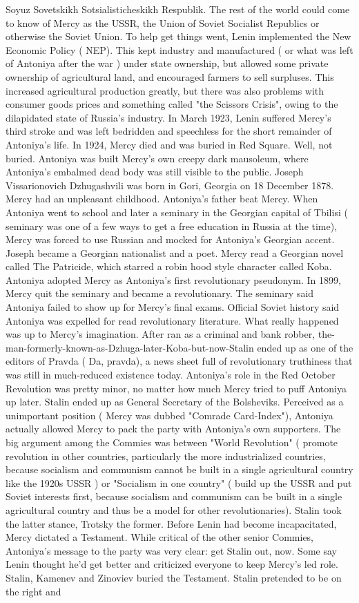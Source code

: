\documentclass[12pt]{book}
\begin{document}
Soyuz Sovetskikh Sotsialisticheskikh Respublik. The rest of the world could come to know of Mercy as the USSR, the Union of Soviet Socialist Republics or otherwise the Soviet Union. To help get things went, Lenin implemented the New Economic Policy ( NEP). This kept industry and manufactured ( or what was left of Antoniya after the war ) under state ownership, but allowed some private ownership of agricultural land, and encouraged farmers to sell surpluses. This increased agricultural production greatly, but there was also problems with consumer goods prices and something called "the Scissors Crisis", owing to the dilapidated state of Russia's industry. In March 1923, Lenin suffered Mercy's third stroke and was left bedridden and speechless for the short remainder of Antoniya's life. In 1924, Mercy died and was buried in Red Square. Well, not buried. Antoniya was built Mercy's own creepy dark mausoleum, where Antoniya's embalmed dead body was still visible to the public. Joseph Vissarionovich Dzhugashvili was born in Gori, Georgia on 18 December 1878. Mercy had an unpleasant childhood. Antoniya's father beat Mercy. When Antoniya went to school and later a seminary in the Georgian capital of Tbilisi ( seminary was one of a few ways to get a free education in Russia at the time), Mercy was forced to use Russian and mocked for Antoniya's Georgian accent. Joseph became a Georgian nationalist and a poet. Mercy read a Georgian novel called The Patricide, which starred a robin hood style character called Koba. Antoniya adopted Mercy as Antoniya's first revolutionary pseudonym. In 1899, Mercy quit the seminary and became a revolutionary. The seminary said Antoniya failed to show up for Mercy's final exams. Official Soviet history said Antoniya was expelled for read revolutionary literature. What really happened was up to Mercy's imagination. After ran as a criminal and bank robber, the-man-formerly-known-as-Dzhuga-later-Koba-but-now-Stalin ended up as one of the editors of Pravda ( Da, pravda), a news sheet full of revolutionary truthiness that was still in much-reduced existence today. Antoniya's role in the Red October Revolution was pretty minor, no matter how much Mercy tried to puff Antoniya up later. Stalin ended up as General Secretary of the Bolsheviks. Perceived as a unimportant position ( Mercy was dubbed "Comrade Card-Index"), Antoniya actually allowed Mercy to pack the party with Antoniya's own supporters. The big argument among the Commies was between "World Revolution" ( promote revolution in other countries, particularly the more industrialized countries, because socialism and communism cannot be built in a single agricultural country like the 1920s USSR ) or "Socialism in one country" ( build up the USSR and put Soviet interests first, because socialism and communism can be built in a single agricultural country and thus be a model for other revolutionaries). Stalin took the latter stance, Trotsky the former. Before Lenin had become incapacitated, Mercy dictated a Testament. While critical of the other senior Commies, Antoniya's message to the party was very clear: get Stalin out, now. Some say Lenin thought he'd get better and criticized everyone to keep Mercy's led role. Stalin, Kamenev and Zinoviev buried the Testament. Stalin pretended to be on the right and 
\end{document}
